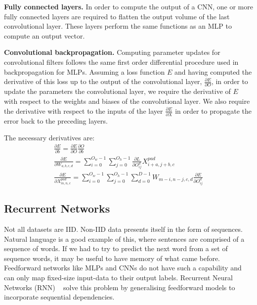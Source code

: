 \noindent \textbf{Fully connected layers.} In order to compute the output of a CNN, one or more fully connected layers are required to flatten the output volume of the last convolutional layer. These layers perform the same functions as an MLP to compute an output vector. \par

\noindent \textbf{Convolutional backpropagation.} Computing parameter updates for convolutional filters follows the same first order differential procedure used in backpropagation for MLPs. Assuming a loss function $ E $ and having computed the derivative of this loss up to the output of the convolutional layer, $ \frac{\partial E} {\partial O} $, in order to update the parameters the convolutional layer, we require the derivative of $ E $ with respect to the weights and biases of the convolutional layer. We also require the derivative with respect to the inputs of the layer $\frac{\partial E} {\partial X}$ in order to propagate the error back to the preceding layers. \par

\noindent The necessary derivatives are:
\unskip
\begin{subequations}
	\begin{gather}
		\frac{\partial E} {\partial b} = \frac{\partial E} {\partial O}\frac{\partial O} {\partial b} \\
		\frac{\partial E} {\partial W_{a,b,c,d}} = \sum_{i=0}^{O_w - 1}\sum_{j=0}^{O_h - 1}\frac{\partial L} {\partial O_{ij}^{d}}X_{i+a,j+b,c}^{pad} \\
		\frac{\partial E} {\partial X_{m,n,c}^{pad}} = \sum_{i=0}^{O_w - 1}\sum_{j=0}^{O_h - 1}\sum_{d=0}^{D - 1}W_{m-i,n-j,c,d}\frac{\partial E} {\partial O_{ij}^{d}}
	\end{gather}
\end{subequations}


\subsection{Recurrent Networks}

Not all datasets are IID. Non-IID data presents itself in the form of sequences. Natural language is a good example of this, where sentences are comprised of a sequence of words. If we had to try to predict the next word from a set of sequence words, it may be useful to have memory of what came before. Feedforward networks like MLPs and CNNs do not have such a capability and can only map fixed-size input-data to their output labels. Recurrent Neural Networks (RNN) ~\citep{werbos1988generalization} solve this problem by generalising feedforward models to incorporate sequential dependencies. \bigskip

